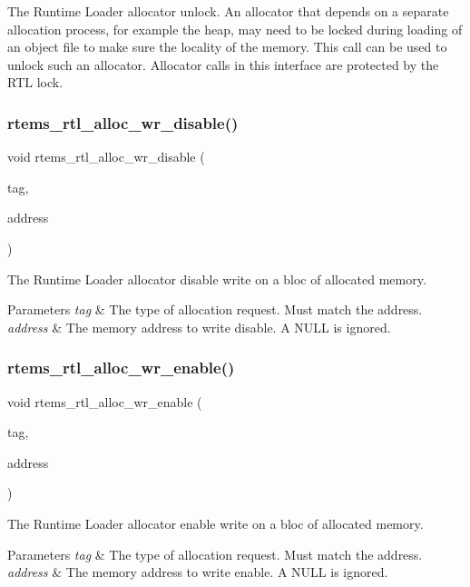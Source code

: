 The Runtime Loader allocator unlock. An allocator that depends on a separate allocation process, for example the heap, may need to be locked during loading of an object file to make sure the locality of the memory. This call can be used to unlock such an allocator. Allocator calls in this interface are protected by the R\+TL lock. \mbox{\label{rtl-allocator_8c_a97d8fccb913b102e6d102cc86431ad64}} 
\subsubsection{\texorpdfstring{rtems\_rtl\_alloc\_wr\_disable()}{rtems\_rtl\_alloc\_wr\_disable()}}
{\footnotesize\ttfamily void rtems\+\_\+rtl\+\_\+alloc\+\_\+wr\+\_\+disable (\begin{DoxyParamCaption}\item[{\mbox{\hyperlink{rtl-allocator_8h_a445a8615118b7fc14005ab20583153fd}{rtems\+\_\+rtl\+\_\+alloc\+\_\+tag}}}]{tag,  }\item[{void $\ast$}]{address }\end{DoxyParamCaption})}

The Runtime Loader allocator disable write on a bloc of allocated memory.


\begin{DoxyParams}{Parameters}
{\em tag} & The type of allocation request. Must match the address. \\
\hline
{\em address} & The memory address to write disable. A N\+U\+LL is ignored. \\
\hline
\end{DoxyParams}
\mbox{\label{rtl-allocator_8c_a4453db077482ecf6647ce38e2381c45c}} 
\subsubsection{\texorpdfstring{rtems\_rtl\_alloc\_wr\_enable()}{rtems\_rtl\_alloc\_wr\_enable()}}
{\footnotesize\ttfamily void rtems\+\_\+rtl\+\_\+alloc\+\_\+wr\+\_\+enable (\begin{DoxyParamCaption}\item[{\mbox{\hyperlink{rtl-allocator_8h_a445a8615118b7fc14005ab20583153fd}{rtems\+\_\+rtl\+\_\+alloc\+\_\+tag}}}]{tag,  }\item[{void $\ast$}]{address }\end{DoxyParamCaption})}

The Runtime Loader allocator enable write on a bloc of allocated memory.


\begin{DoxyParams}{Parameters}
{\em tag} & The type of allocation request. Must match the address. \\
\hline
{\em address} & The memory address to write enable. A N\+U\+LL is ignored. \\
\hline
\end{DoxyParams}
